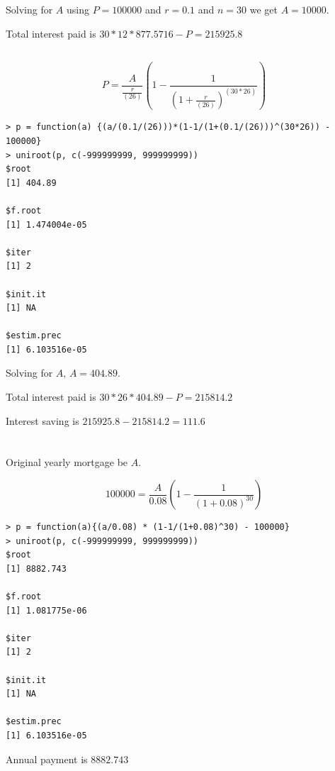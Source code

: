 \documentclass[11pt]{scrartcl}
\begin{document}
Solving for $A$ using $P=100000$ and $r=0.1$ and $n=30$ we get $A=10000$.

Total interest paid is $30*12*877.5716 - P = 215925.8$

\subsection{}

\[P = \frac{A}{\frac{r}{(26)}}\left(1-\frac{1}{\left(1+\frac{r}{(26)}\right)^{(30*26)}}\right)\]

\begin{lstlisting}
> p = function(a) {(a/(0.1/(26)))*(1-1/(1+(0.1/(26)))^(30*26)) - 100000}
> uniroot(p, c(-999999999, 999999999))
$root
[1] 404.89

$f.root
[1] 1.474004e-05

$iter
[1] 2

$init.it
[1] NA

$estim.prec
[1] 6.103516e-05
\end{lstlisting}

Solving for $A$, $A=404.89$.

Total interest paid is $30*26*404.89 - P =  215814.2$

Interest saving is $215925.8 - 215814.2 = 111.6$

\section{}

\subsection{}

Original yearly mortgage be $A$.

\[100000 = \frac{A}{0.08}\left(1 - \frac{1}{(1+0.08)^{30}}\right)\]

\begin{lstlisting}
> p = function(a){(a/0.08) * (1-1/(1+0.08)^30) - 100000}
> uniroot(p, c(-999999999, 999999999))
$root
[1] 8882.743

$f.root
[1] 1.081775e-06

$iter
[1] 2

$init.it
[1] NA

$estim.prec
[1] 6.103516e-05
\end{lstlisting}

Annual payment is $8882.743$

\subsection{}
\end{document}
